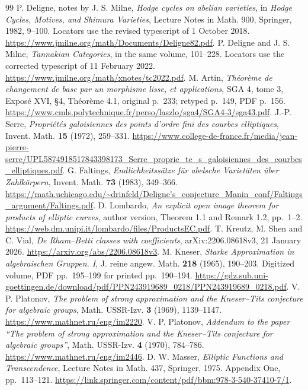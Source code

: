 \documentclass[11pt]{article}
\theoremstyle{definition}\newtheorem{definition}[theorem]{Definition}
\theoremstyle{remark}\newtheorem{remark}[theorem]{Remark}
\begin{document}
\begin{thebibliography}{99}
 P. Deligne, notes by J. S. Milne, \emph{Hodge cycles on abelian varieties}, in \emph{Hodge Cycles, Motives, and Shimura Varieties}, Lecture Notes in Math. 900, Springer, 1982, 9--100. Locators use the revised typescript of 1 October 2018. \url{https://www.jmilne.org/math/Documents/Deligne82.pdf}.
 P. Deligne and J. S. Milne, \emph{Tannakian Categories}, in the same volume, 101--228. Locators use the corrected typescript of 11 February 2022. \url{https://www.jmilne.org/math/xnotes/tc2022.pdf}.
 M. Artin, \emph{Th\'eor\`eme de changement de base par un morphisme lisse, et applications}, SGA 4, tome 3, Expos\'e XVI, \S4, Th\'eor\`eme 4.1, original p.~233; retyped p.~149, PDF p.~156. \url{https://www.cmls.polytechnique.fr/perso/laszlo/sga4/SGA4-3/sga43.pdf}.
 J.-P. Serre, \emph{Propri\'et\'es galoisiennes des points d'ordre fini des courbes elliptiques}, Invent. Math. \textbf{15} (1972), 259--331. \url{https://www.college-de-france.fr/media/jean-pierre-serre/UPL5874918517843398173_Serre_proprie_te_s_galoisiennes_des_courbes_elliptiques.pdf}.
 G. Faltings, \emph{Endlichkeitss\"atze f\"ur abelsche Variet\"aten \"uber Zahlk\"orpern}, Invent. Math. \textbf{73} (1983), 349--366. \url{https://math.uchicago.edu/~drinfeld/Deligne's_conjecture_Manin_conf/Faltings_argument/Faltings.pdf}.
 D. Lombardo, \emph{An explicit open image theorem for products of elliptic curves}, author version, Theorem 1.1 and Remark 1.2, pp.~1--2. \url{https://web.dm.unipi.it/lombardo/files/ProductsEC.pdf}.
 T. Kreutz, M. Shen and C. Vial, \emph{De Rham--Betti classes with coefficients}, arXiv:2206.08618v3, 21 January 2026. \url{https://arxiv.org/abs/2206.08618v3}.
 M. Kneser, \emph{Starke Approximation in algebraischen Gruppen. I}, J. reine angew. Math. \textbf{218} (1965), 190--203. Digitized volume, PDF pp.~195--199 for printed pp.~190--194. \url{https://gdz.sub.uni-goettingen.de/download/pdf/PPN243919689_0218/PPN243919689_0218.pdf}.
 V. P. Platonov, \emph{The problem of strong approximation and the Kneser--Tits conjecture for algebraic groups}, Math. USSR-Izv. \textbf{3} (1969), 1139--1147. \url{https://www.mathnet.ru/eng/im2220}.
 V. P. Platonov, \emph{Addendum to the paper ``The problem of strong approximation and the Kneser--Tits conjecture for algebraic groups''}, Math. USSR-Izv. \textbf{4} (1970), 784--786. \url{https://www.mathnet.ru/eng/im2446}.
 D. W. Masser, \emph{Elliptic Functions and Transcendence}, Lecture Notes in Math. 437, Springer, 1975. Appendix One, pp.~113--121. \url{https://link.springer.com/content/pdf/bbm:978-3-540-37410-7/1}.

\end{thebibliography}
\end{document}
